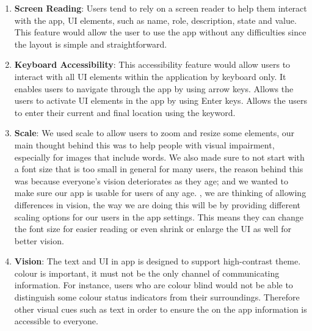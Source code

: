 \begin{enumerate}
	\item \textbf{Screen Reading}:  Users tend to rely on a screen reader to help them interact with the app,  UI elements, such as name, role, description, state and value. This feature would allow the user to use the app without any difficulties since the layout is simple and straightforward. 

	\item \textbf{Keyboard Accessibility}: This accessibility feature would allow users to interact with all UI elements within the application by keyboard only. It enables users to navigate through the app by using arrow keys. Allows the users to activate UI elements in the app by using Enter keys. Allows the users to enter their current and final location using the keyword. 

	\item \textbf{Scale}:  We used scale to allow users to zoom and resize some elements, our main thought behind this was to help people with visual impairment, especially for images that include words. We also made sure to not start with a font size that is too small in general for many users, the reason behind this was because everyone’s vision deteriorates as they age; and we wanted to make sure our app is usable for users of any age. , we are thinking of allowing differences in vision, the way we are doing this will be by providing different scaling options for our users in the app settings. This means they can change the font size for easier reading or even shrink or enlarge the UI as well for better vision. 

	\item \textbf{Vision}: The text and UI in  app is designed to support high-contrast theme.   colour is important, it must not be the only channel of communicating information. For instance, users who are colour blind would not be able to distinguish some colour status indicators from their surroundings. Therefore  other visual cues such as text  in order to ensure the on the app information is accessible to everyone. 
    
\end{enumerate}

